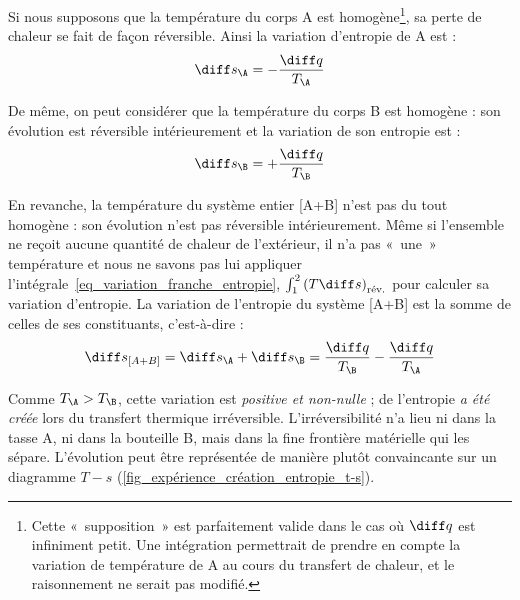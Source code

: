 		Si nous supposons que la température du corps A est homogène\footnote{Cette «~supposition~» est parfaitement valide dans le cas où $\diff q$ est infiniment petit. Une intégration permettrait de prendre en compte la variation de température de A au cours du transfert de chaleur, et le raisonnement ne serait pas modifié.},	sa perte de chaleur se fait de façon réversible. Ainsi la variation d’entropie de A est :
		\begin{equation*}
			\diff s_\A = - \frac{\diff q}{T_\A}
		\end{equation*}

		De même, on peut considérer que la température du corps B est homogène : son évolution est réversible intérieurement et la variation de son entropie est :
		\begin{equation*}
			\diff s_\B = + \frac{\diff q}{T_\B }
		\end{equation*}

		En revanche, la température du système entier [A+B] n’est pas du tout homogène : son évolution n’est pas réversible intérieurement. Même si l’ensemble ne reçoit aucune quantité de chaleur de l’extérieur, il n’a pas «~une~» température et nous ne savons pas lui appliquer l’intégrale~\ref{eq_variation_franche_entropie}, $\int_1^2 \left(T \diff s \right)_\text{rév.}$ pour calculer sa variation d’entropie. La variation de l’entropie du système [A+B] est la somme de celles de ses constituants, c’est-à-dire :
		\begin{equation}
			\diff s_{[A+B]} = \diff s_\A + \diff s_\B = \frac{\diff q}{T_\B } - \frac{\diff q}{T_\A}
		\end{equation}

		Comme $T_\A > T_\B$, cette variation est \emph{positive et non-nulle} ; de l’entropie \emph{a été créée} lors du transfert thermique irréversible. L’irréversibilité n’a lieu ni dans la tasse A, ni dans la bouteille B, mais dans la fine frontière matérielle qui les sépare. L’évolution peut être représentée de manière plutôt convaincante sur un diagramme $T-s$ (\cref{fig_expérience_création_entropie_t-s}).

